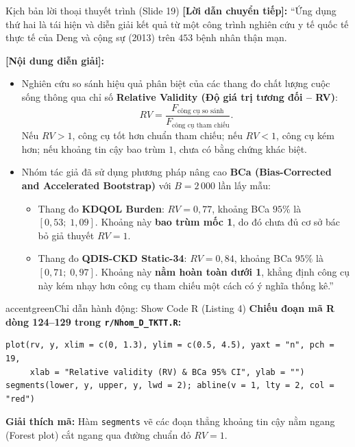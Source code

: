 \documentclass[10pt,a4paper]{article}
\begin{document}
\begin{scriptbox}{Kịch bản lời thoại thuyết trình (Slide 19)}
    \textbf{[Lời dẫn chuyển tiếp]:} ``Ứng dụng thứ hai là tái hiện và diễn giải kết quả từ một công trình nghiên cứu y tế quốc tế thực tế của Deng và cộng sự (2013) trên $453$ bệnh nhân thận mạn.
    
    \textbf{[Nội dung diễn giải]:} 
    \begin{itemize}
        \item Nghiên cứu so sánh hiệu quả phân biệt của các thang đo chất lượng cuộc sống thông qua chỉ số \textbf{Relative Validity (Độ giá trị tương đối -- RV)}:
        \[
        RV = \frac{F_{\text{công cụ so sánh}}}{F_{\text{công cụ tham chiếu}}}.
        \]
        Nếu $RV > 1$, công cụ tốt hơn chuẩn tham chiếu; nếu $RV < 1$, công cụ kém hơn; nếu khoảng tin cậy bao trùm $1$, chưa có bằng chứng khác biệt.
        \item Nhóm tác giả đã sử dụng phương pháp nâng cao \textbf{BCa (Bias-Corrected and Accelerated Bootstrap)} với $B=2\,000$ lần lấy mẫu:
        \begin{itemize}
            \item Thang đo \textbf{KDQOL Burden}: $RV = 0{,}77$, khoảng BCa $95\%$ là $[0{,}53;\; 1{,}09]$. Khoảng này \textbf{bao trùm mốc 1}, do đó chưa đủ cơ sở bác bỏ giả thuyết $RV=1$.
            \item Thang đo \textbf{QDIS-CKD Static-34}: $RV = 0{,}84$, khoảng BCa $95\%$ là $[0{,}71;\; 0{,}97]$. Khoảng này \textbf{nằm hoàn toàn dưới 1}, khẳng định công cụ này kém nhạy hơn công cụ tham chiếu một cách có ý nghĩa thống kê.''
        \end{itemize}
    \end{itemize}
\end{scriptbox}

\begin{actionbox}{accentgreen}{Chỉ dẫn hành động: Show Code R (Listing 4)}
    \textbf{Chiếu đoạn mã R dòng 124--129 trong \texttt{r/Nhom\_D\_TKTT.R}:}
\begin{verbatim}
plot(rv, y, xlim = c(0, 1.3), ylim = c(0.5, 4.5), yaxt = "n", pch = 19,
     xlab = "Relative validity (RV) & BCa 95% CI", ylab = "")
segments(lower, y, upper, y, lwd = 2); abline(v = 1, lty = 2, col = "red")
\end{verbatim}
    \textbf{Giải thích mã:} Hàm \texttt{segments} vẽ các đoạn thẳng khoảng tin cậy nằm ngang (Forest plot) cắt ngang qua đường chuẩn đỏ $RV=1$.
\end{actionbox}
\end{document}
